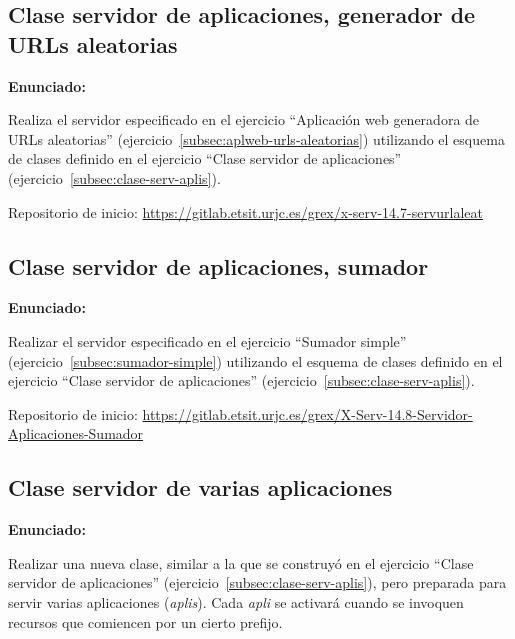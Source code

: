 \subsection{Clase servidor de aplicaciones, generador de URLs aleatorias}
\label{subsec:aplweb-clase-urls-aleatorias}

\textbf{Enunciado:}

Realiza el servidor especificado en el ejercicio ``Aplicación web generadora de URLs aleatorias'' (ejercicio~\ref{subsec:aplweb-urls-aleatorias}) utilizando el esquema de clases definido en el ejercicio ``Clase servidor de aplicaciones'' (ejercicio~\ref{subsec:clase-serv-aplis}).

Repositorio de inicio: \url{https://gitlab.etsit.urjc.es/grex/x-serv-14.7-servurlaleat}

\subsection{Clase servidor de aplicaciones, sumador}
\label{subsec:clase-sumador-simple}

\textbf{Enunciado:}

Realizar el servidor especificado en el ejercicio ``Sumador simple'' (ejercicio~\ref{subsec:sumador-simple}) utilizando el esquema de clases definido en el ejercicio ``Clase servidor de aplicaciones'' (ejercicio~\ref{subsec:clase-serv-aplis}).

Repositorio de inicio: \url{https://gitlab.etsit.urjc.es/grex/X-Serv-14.8-Servidor-Aplicaciones-Sumador}

\subsection{Clase servidor de varias aplicaciones}
\label{subsec:clase-serv-aplis-multi}

\textbf{Enunciado:}

Realizar una nueva clase, similar a la que se construyó en el ejercicio ``Clase servidor de aplicaciones'' (ejercicio~\ref{subsec:clase-serv-aplis}), pero preparada para servir varias aplicaciones (\emph{aplis}). Cada \emph{apli} se activará cuando se invoquen recursos que comiencen por un cierto prefijo.

